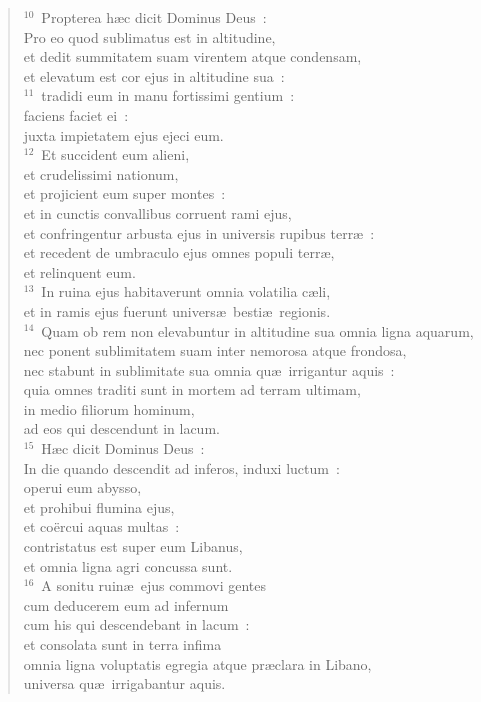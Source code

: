 \begin{verse}${}^{10}$~Propterea h\ae c dicit Dominus Deus~:\\ Pro eo quod sublimatus est in altitudine,\\ et dedit summitatem suam virentem atque condensam,\\ et elevatum est cor ejus in altitudine sua~:\\
${}^{11}$~tradidi eum in manu fortissimi gentium~:\\ faciens faciet ei~:\\ juxta impietatem ejus ejeci eum.\\
${}^{12}$~Et succident eum alieni,\\ et crudelissimi nationum,\\ et projicient eum super montes~:\\ et in cunctis convallibus corruent rami ejus,\\ et confringentur arbusta ejus in universis rupibus terr\ae~:\\ et recedent de umbraculo ejus omnes populi terr\ae ,\\ et relinquent eum.\\
${}^{13}$~In ruina ejus habitaverunt omnia volatilia c\ae li,\\ et in ramis ejus fuerunt univers\ae\ besti\ae\ regionis.\\
${}^{14}$~Quam ob rem non elevabuntur in altitudine sua omnia ligna aquarum,\\ nec ponent sublimitatem suam inter nemorosa atque frondosa,\\ nec stabunt in sublimitate sua omnia qu\ae\ irrigantur aquis~:\\ quia omnes traditi sunt in mortem ad terram ultimam,\\ in medio filiorum hominum,\\ ad eos qui descendunt in lacum.\\
${}^{15}$~H\ae c dicit Dominus Deus~:\\ In die quando descendit ad inferos, induxi luctum~:\\ operui eum abysso,\\ et prohibui flumina ejus,\\ et co\"ercui aquas multas~:\\ contristatus est super eum Libanus,\\ et omnia ligna agri concussa sunt.\\
${}^{16}$~A sonitu ruin\ae\ ejus commovi gentes\\ cum deducerem eum ad infernum\\ cum his qui descendebant in lacum~:\\ et consolata sunt in terra infima\\ omnia ligna voluptatis egregia atque pr\ae clara in Libano,\\ universa qu\ae\ irrigabantur aquis.\\

\end{verse}
